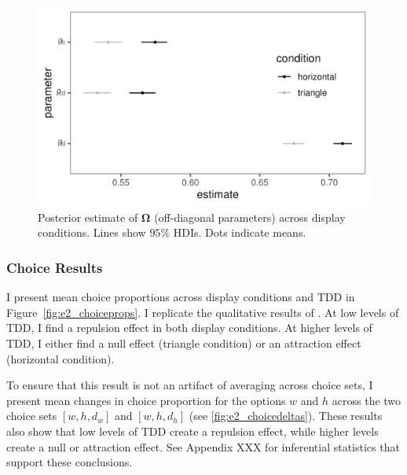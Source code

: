 \begin{figure}
   \includegraphics[width=\textwidth]{figures/bayes_circle_area_sigma_constant_comp_effect_omega_plot.jpeg}
   \caption{Posterior estimate of $\boldsymbol{\Omega}$ (off-diagonal parameters) across display conditions. Lines show $95\%$ HDIs.  Dots indicate means.}
   \label{fig:omega}
\end{figure}

\subsubsection{Choice Results}

I present mean choice proportions across display conditions and TDD in Figure~\ref{fig:e2_choiceprops}. I replicate the qualitative results of \textcite{spektorWhenGoodLooks2018b}. At low levels of TDD, I find a repulsion effect in both display conditions. At higher levels of TDD, I either find a null effect (triangle condition) or an attraction effect (horizontal condition). 

To ensure that this result is not an artifact of averaging across choice sets, I present mean changes in choice proportion for the options $w$ and $h$ across the two choice sets $[w,h,d_{w}]$ and $[w,h,d_{h}]$ (see \ref{fig:e2_choicedeltas}). These results also show that low levels of TDD create a repulsion effect, while higher levels create a null or attraction effect. See Appendix XXX for inferential statistics that support these conclusions.

